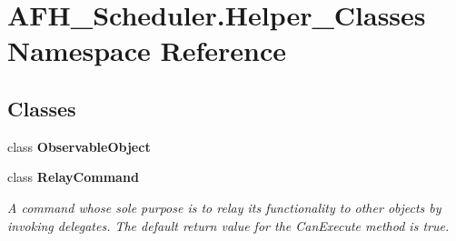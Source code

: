 \section{A\+F\+H\+\_\+\+Scheduler.\+Helper\+\_\+\+Classes Namespace Reference}
\label{namespace_a_f_h___scheduler_1_1_helper___classes}
\subsection*{Classes}
\begin{DoxyCompactItemize}
\item 
class \textbf{ Observable\+Object}
\item 
class \textbf{ Relay\+Command}
\begin{DoxyCompactList}\small\item\em A command whose sole purpose is to relay its functionality to other objects by invoking delegates. The default return value for the Can\+Execute method is \textquotesingle{}true\textquotesingle{}. \end{DoxyCompactList}\end{DoxyCompactItemize}
